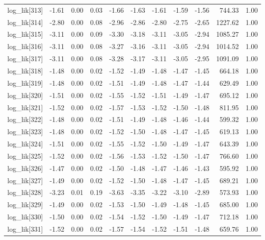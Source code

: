 \begin{table}[ht]
\begin{tabular}{rrrrrrrrrrr}
  log\_lik[313] & -1.61 & 0.00 & 0.03 & -1.66 & -1.63 & -1.61 & -1.59 & -1.56 & 744.33 & 1.00 \\ 
  log\_lik[314] & -2.80 & 0.00 & 0.08 & -2.96 & -2.86 & -2.80 & -2.75 & -2.65 & 1227.62 & 1.00 \\ 
  log\_lik[315] & -3.11 & 0.00 & 0.09 & -3.30 & -3.18 & -3.11 & -3.05 & -2.94 & 1085.27 & 1.00 \\ 
  log\_lik[316] & -3.11 & 0.00 & 0.08 & -3.27 & -3.16 & -3.11 & -3.05 & -2.94 & 1014.52 & 1.00 \\ 
  log\_lik[317] & -3.11 & 0.00 & 0.08 & -3.28 & -3.17 & -3.11 & -3.05 & -2.95 & 1091.09 & 1.00 \\ 
  log\_lik[318] & -1.48 & 0.00 & 0.02 & -1.52 & -1.49 & -1.48 & -1.47 & -1.45 & 664.18 & 1.00 \\ 
  log\_lik[319] & -1.48 & 0.00 & 0.02 & -1.51 & -1.49 & -1.48 & -1.47 & -1.44 & 629.49 & 1.00 \\ 
  log\_lik[320] & -1.51 & 0.00 & 0.02 & -1.55 & -1.52 & -1.51 & -1.49 & -1.47 & 695.12 & 1.00 \\ 
  log\_lik[321] & -1.52 & 0.00 & 0.02 & -1.57 & -1.53 & -1.52 & -1.50 & -1.48 & 811.95 & 1.00 \\ 
  log\_lik[322] & -1.48 & 0.00 & 0.02 & -1.51 & -1.49 & -1.48 & -1.46 & -1.44 & 599.32 & 1.00 \\ 
  log\_lik[323] & -1.48 & 0.00 & 0.02 & -1.52 & -1.50 & -1.48 & -1.47 & -1.45 & 619.13 & 1.00 \\ 
  log\_lik[324] & -1.51 & 0.00 & 0.02 & -1.55 & -1.52 & -1.50 & -1.49 & -1.47 & 643.39 & 1.00 \\ 
  log\_lik[325] & -1.52 & 0.00 & 0.02 & -1.56 & -1.53 & -1.52 & -1.50 & -1.47 & 766.60 & 1.00 \\ 
  log\_lik[326] & -1.47 & 0.00 & 0.02 & -1.50 & -1.48 & -1.47 & -1.46 & -1.43 & 595.92 & 1.00 \\ 
  log\_lik[327] & -1.49 & 0.00 & 0.02 & -1.52 & -1.50 & -1.48 & -1.47 & -1.45 & 689.21 & 1.00 \\ 
  log\_lik[328] & -3.23 & 0.01 & 0.19 & -3.63 & -3.35 & -3.22 & -3.10 & -2.89 & 573.93 & 1.00 \\ 
  log\_lik[329] & -1.49 & 0.00 & 0.02 & -1.53 & -1.50 & -1.49 & -1.48 & -1.45 & 685.00 & 1.00 \\ 
  log\_lik[330] & -1.50 & 0.00 & 0.02 & -1.54 & -1.52 & -1.50 & -1.49 & -1.47 & 712.18 & 1.00 \\ 
  log\_lik[331] & -1.52 & 0.00 & 0.02 & -1.57 & -1.54 & -1.52 & -1.51 & -1.48 & 659.76 & 1.00 \\ 

\end{tabular}
\end{table}

